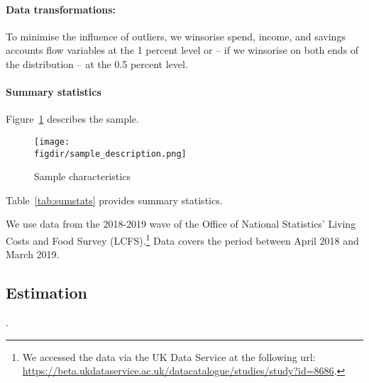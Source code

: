 \paragraph{Data transformations:}%
\label{par:data_transformations}

To minimise the influence of outliers, we winsorise spend, income, and savings
accounts flow variables at the 1 percent level or -- if we winsorise on both
ends of the distribution -- at the 0.5 percent level.


\paragraph{Summary statistics}%
\label{par:summary_statistics}

Figure~\ref{fig:sample_description} describes the sample.

\begin{figure}[H]
    \centering
    \caption{Sample characteristics}
    \texttt{[image: \\figdir/sample\_description.png]}
    \label{fig:sample_description}
\end{figure}

Table~\ref{tab:sumstats} provides summary statistics.



We use data from the 2018-2019 wave of the Office of National Statistics' Living Costs and Food
Survey (LCFS).\footnote{We accessed the data via the UK Data Service at the
following url:
\url{https://beta.ukdataservice.ac.uk/datacatalogue/studies/study?id=8686}.}
Data covers the period between April 2018 and March 2019.


\subsection{Estimation}%
\label{sub:estimation}


\citet{callaway2021difference}.


